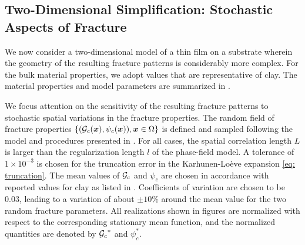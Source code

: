 \subsection{Two-Dimensional Simplification: Stochastic Aspects of Fracture}

We now consider a two-dimensional model of a thin film on a substrate wherein the geometry of the resulting fracture patterns is considerably more complex.  For the bulk material properties, we adopt values that are representative of clay. The material properties and model parameters are summarized in .

We focus attention on the sensitivity of the resulting fracture patterns to stochastic spatial variations in the fracture properties. The random field of fracture properties $\{({\mathcal{G}_c}(\boldsymbol{x}),\psi_c(\boldsymbol{x})), \boldsymbol{x} \in \Omega\}$ is defined and sampled following the model and procedures presented in . For all cases, the spatial correlation length $L$ is larger than the regularization length $l$ of the phase-field model. A tolerance of $1 \times 10^{-3}$ is chosen for the truncation error in the Karhunen-Lo\`{e}ve expansion \eqref{eq: truncation}.
The mean values of ${\mathcal{G}_c}$ and $\psi_c$ are chosen in accordance with reported values for clay as listed in . Coefficients of variation are chosen to be $0.03$, leading to a variation of about $\pm 10\%$ around the mean value for the two random fracture parameters. All realizations shown in figures are normalized with respect to the corresponding stationary mean function, and the normalized quantities are denoted by ${\mathcal{G}_c}^*$ and $\psi_c^*$.

